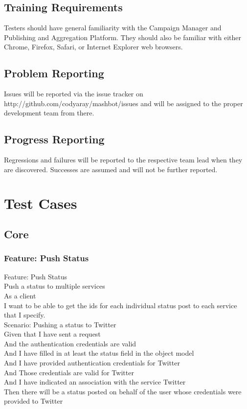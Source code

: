 \documentclass[12pt]{article}
\begin{document}
\subsection{Training Requirements}
Testers should have general familiarity with the Campaign Manager and Publishing and Aggregation Platform. They should also be familiar with either Chrome, Firefox, Safari, or Internet Explorer web browsers.

\subsection{Problem Reporting}
Issues will be reported via the issue tracker on http://github.com/codyaray/mashbot/issues and will be assigned to the proper development team from there.
\subsection{Progress Reporting}
Regressions and failures will be reported to the respective team lead when they are discovered. Successes are assumed and will not be further reported.

\section{Test Cases}

\subsection{Core}

\subsubsection{Feature: Push Status}

Feature: Push Status \\
	Push a status to multiple services \\
	As a client \\
	I want to be able to get the ids for each individual status post to each  
	service that I specify. \\
	
Scenario: Pushing a status to Twitter \\
	Given that I have sent a request \\
	And the authentication credentials are valid \\
	And I have filled in at least the status field in the object model \\
	And I have provided authentication credentials for Twitter \\ 
	And Those credentials are valid for Twitter \\ 
	And I have indicated an association with the service Twitter \\
	Then there will be a status posted on behalf of the user whose credentials 
	were provided to Twitter \\
\end{document}
